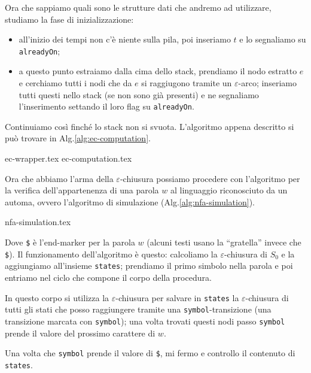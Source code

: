 \documentclass[class=book, crop=false, oneside, 12pt]{standalone}
\begin{document}
Ora che sappiamo quali sono le strutture dati che andremo ad utilizzare, studiamo la fase di inizializzazione: 

\begin{itemize}
    \item all’inizio dei tempi non c’è niente sulla pila, poi inseriamo \(t\) e lo segnaliamo su \texttt{alreadyOn};
    \item a questo punto estraiamo dalla cima dello stack, prendiamo il nodo estratto \(e\) e cerchiamo tutti i nodi che da \(e\) si raggiugono tramite un \(\varepsilon\)-arco; inseriamo tutti questi nello stack (se non sono già presenti) e ne segnaliamo l'inserimento settando il loro flag su \texttt{alreadyOn}.
\end{itemize}

Continuiamo così finché lo stack non si svuota. L'algoritmo appena descritto si può trovare in Alg.\ref{alg:ec-computation}.

	{ec-wrapper.tex}
	{ec-computation.tex}

Ora che abbiamo l'arma della \(\varepsilon\)-chiusura possiamo procedere con l'algoritmo per la verifica dell'appartenenza di una parola \(w\) al linguaggio riconosciuto da un automa, ovvero l'algoritmo di simulazione (Alg.\ref{alg:nfa-simulation}).

{nfa-simulation.tex}

Dove \texttt{\$} è l’end-marker per la parola \(w\) (alcuni testi usano la “gratella” invece che \texttt{\$}).
Il funzionamento dell'algoritmo è questo: calcoliamo la \(\varepsilon\)-chiusura di \(S_0\) e la aggiungiamo all'insieme \texttt{states}; prendiamo il primo simbolo nella parola e poi entriamo nel ciclo che compone il corpo della procedura.

In questo corpo si utilizza la \(\varepsilon\)-chiusura per salvare in \texttt{states} la \(\varepsilon\)-chiusura di tutti gli stati che posso raggiungere tramite una \texttt{symbol}-transizione (una transizione marcata con \texttt{symbol}); una volta trovati questi nodi passo \texttt{symbol} prende il valore del prossimo carattere di \(w\).

Una volta che \texttt{symbol} prende il valore di \texttt{\$}, mi fermo e controllo il contenuto di \texttt{states}.
\end{document}
